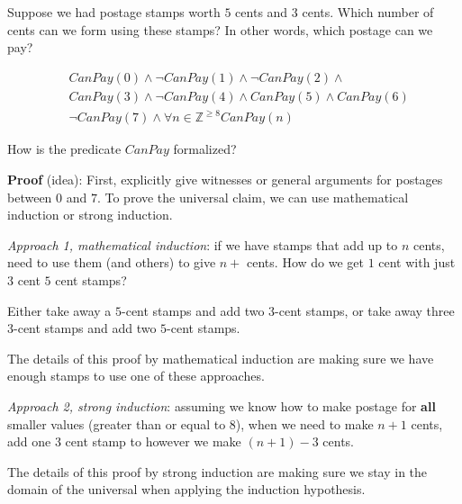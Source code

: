 
Suppose we had postage stamps worth $5$ cents and $3$ cents.
Which number of cents can we form using these stamps?
In other words, which postage can we pay?

\vspace{20pt}

\begin{align*}
    &CanPay(0) \land \lnot CanPay(1) \land \lnot CanPay(2) \land \\
    &CanPay(3) \land \lnot CanPay(4) \land CanPay(5) \land CanPay(6) \\
    &\lnot CanPay(7) \land \forall n \in \mathbb{Z}^{\geq 8} CanPay(n)
\end{align*}

How is the predicate $CanPay$ formalized? 
$\phantom{\exists x \in \mathbb{N} \exists y \in \mathbb{N}  ( 5x+3y = n)}$


{\bf Proof} (idea): First, explicitly give witnesses or general arguments
for postages between $0$ and $7$. 
To prove the universal claim, we can use mathematical induction or strong induction.

{\it Approach 1, mathematical induction}: if we have
stamps that add up to $n$ cents, need to use them (and others)
to give $n+$ cents. How do we get $1$ cent with just $3$ cent
$5$ cent stamps?

Either take away a $5$-cent stamps and add two $3$-cent stamps,
or take away three $3$-cent stamps and add two $5$-cent stamps.

The details of this proof by mathematical induction
are making sure we have enough 
stamps to use one of these approaches.

{\it Approach 2, strong induction}: assuming we know how to make postage
for {\bf all} smaller values (greater than or equal to $8$), when
we need to make $n+1$ cents, add one $3$ cent stamp to 
however we make $(n+1) - 3$ cents.

The details of this proof by strong induction are making sure we 
stay in the domain of the universal when applying the induction hypothesis.
